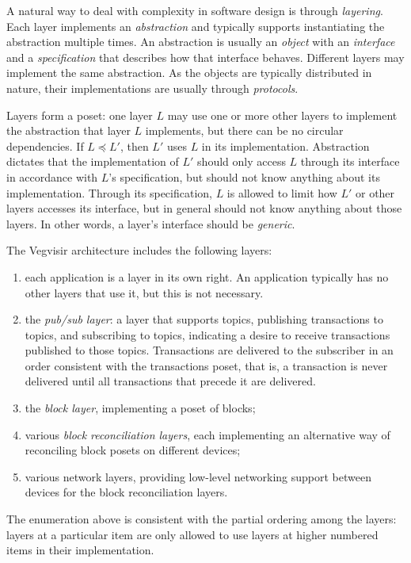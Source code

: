 \documentclass{article}
\begin{document}
A natural way to deal with complexity in software design is through
\emph{layering}.
Each layer implements an \emph{abstraction} and typically
supports instantiating the abstraction multiple times.  An abstraction
is usually an \emph{object} with an \emph{interface} and a
\emph{specification} that describes how that interface behaves.
Different layers may implement the same abstraction.
As the objects are typically distributed in nature, their implementations
are usually through \emph{protocols}.

Layers form a poset: one layer $L$ may use one or more other layers to
implement the abstraction that layer $L$ implements, but there can be no
circular dependencies.
If $L \preceq L'$, then $L'$ uses $L$ in its implementation.
Abstraction dictates that the implementation of $L'$ should only access
$L$ through its interface in accordance with $L$'s specification, but
should not know anything about its implementation.
Through its specification, $L$ is allowed to limit how $L'$ or other layers
accesses its interface, but in
general should not know anything about those layers.  In other words,
a layer's interface should be \emph{generic}.

The Vegvisir architecture includes the following layers:
\begin{enumerate}
\item each application is a layer in its own right.  An application typically
has no other layers that use it, but this is not necessary.
\item the \emph{pub/sub layer}: a layer that supports topics, publishing
transactions to topics, and subscribing to topics, indicating a desire to
receive transactions published to those topics.
Transactions are delivered to the subscriber in an order consistent
with the transactions poset, that is, a transaction is never delivered
until all transactions that precede it are delivered.
\item the \emph{block layer}, implementing a poset of blocks;
\item various \emph{block reconciliation layers}, each implementing an
alternative way of reconciling block posets on different devices;
\item various network layers, providing low-level networking support
between devices for the block reconciliation layers.
\end{enumerate}

The enumeration above is consistent with the partial ordering among
the layers: layers at a particular item are only allowed to use layers
at higher numbered items in their implementation.
\end{document}
